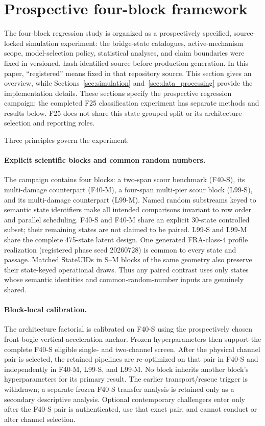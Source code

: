 \section{Prospective four-block framework}
\label{sec:framework}

The four-block regression study is organized as a prospectively specified, source-locked simulation
experiment: the bridge-state catalogues, active-mechanism scope, model-selection
policy, statistical analyses, and claim boundaries were fixed in versioned,
hash-identified source before production generation. In this paper,
``registered'' means fixed in that repository source. This section gives an overview, while
Sections~\ref{sec:simulation} and~\ref{sec:data_processing} provide the
implementation details. These sections specify the prospective regression
campaign; the completed F25 classification experiment has separate methods
and results below. F25 does not share this state-grouped split or its
architecture-selection and reporting roles.

Three principles govern the experiment.

\paragraph{Explicit scientific blocks and common random numbers.}
The campaign contains four blocks: a two-span scour benchmark (F40-S), its
multi-damage counterpart (F40-M), a four-span multi-pier scour block (L99-S),
and its multi-damage counterpart (L99-M). Named random substreams keyed to
semantic state identifiers make all intended comparisons invariant to row
order and parallel scheduling. F40-S and F40-M share an explicit 30-state
controlled subset; their remaining states are not claimed to be paired.
L99-S and L99-M share the complete 475-state latent design. One generated
FRA-class-4 profile realization (registered phase seed 20260728) is common to
every state and passage. Matched StateUIDs in S--M blocks of the same geometry
also preserve their state-keyed operational draws. Thus any paired contrast
uses only states whose semantic identities and common-random-number inputs are
genuinely shared.

\paragraph{Block-local calibration.}
The architecture factorial is calibrated on F40-S using the prospectively
chosen front-bogie vertical-acceleration anchor. Frozen hyperparameters then
support the complete F40-S eligible single- and two-channel screen. After the physical
channel pair is selected, the retained pipelines are re-optimized on that pair
in F40-S and independently in F40-M, L99-S, and L99-M. No block inherits
another block's hyperparameters for its primary result. The earlier
transport/rescue trigger is withdrawn; a separate frozen-F40-S transfer
analysis is retained only as a secondary descriptive analysis. Optional
contemporary challengers enter only after the F40-S pair is authenticated, use
that exact pair, and cannot conduct or alter channel selection.

